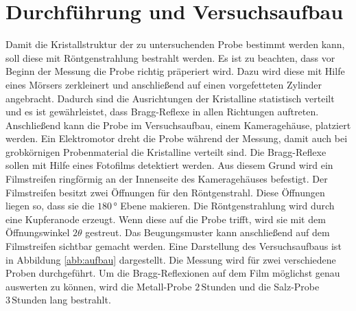 \section{Durchführung und Versuchsaufbau}

Damit die Kristallstruktur der zu untersuchenden Probe bestimmt werden kann, soll diese mit Röntgenstrahlung bestrahlt werden.
Es ist zu beachten, dass vor Beginn der Messung die Probe richtig präperiert wird. Dazu wird diese mit Hilfe eines Mörsers zerkleinert und anschließend auf einen vorgefetteten
Zylinder angebracht.
Dadurch sind die Ausrichtungen der Kristalline statistisch verteilt und es ist gewährleistet, dass Bragg-Reflexe in allen Richtungen auftreten.
Anschließend kann die Probe im Versuchsaufbau, einem Kameragehäuse, platziert werden. Ein Elektromotor dreht die Probe während der Messung, damit auch bei grobkörnigen
Probenmaterial die Kristalline verteilt sind.\newline
Die Bragg-Reflexe sollen mit Hilfe eines Fotofilms detektiert werden. Aus diesem Grund wird ein Filmstreifen ringförmig an der Innenseite des Kameragehäuses
befestigt. Der Filmstreifen besitzt zwei Öffnungen für den
Röntgenstrahl. Diese Öffnungen liegen so, dass sie die $180\,\text{°}$ Ebene makieren\newline.
Die Röntgenstrahlung wird durch eine Kupferanode erzeugt. Wenn diese auf die Probe trifft, wird sie mit dem Öffnungswinkel $2\theta$ gestreut. Das Beugungsmuster kann
anschließend auf dem Filmstreifen sichtbar gemacht werden.
Eine Darstellung des Versuchsaufbaus ist in Abbildung \ref{abb:aufbau} dargestellt.\newline
Die Messung wird für zwei verschiedene Proben durchgeführt. Um die Bragg-Reflexionen auf dem Film möglichst genau auswerten zu können, wird die Metall-Probe
$2\,\text{Stunden}$ und die Salz-Probe $3\,\text{Stunden}$ lang bestrahlt.

